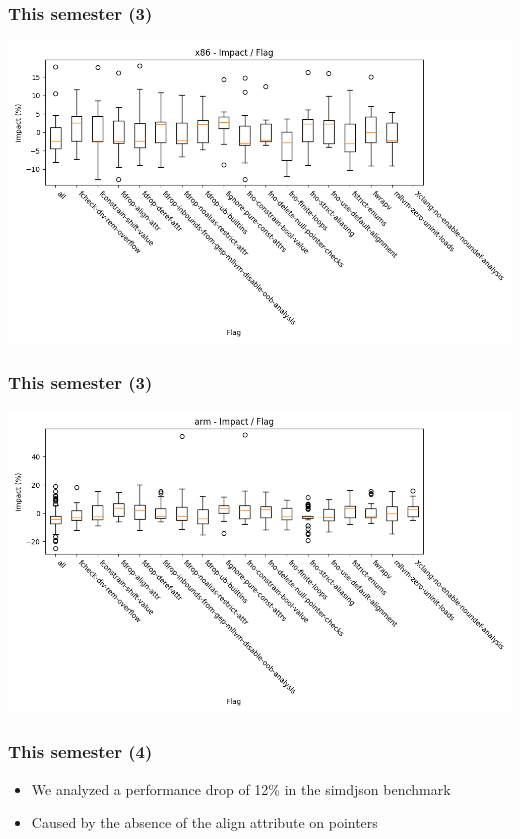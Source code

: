 \documentclass[
	12pt
]{beamer}
\begin{document}
\begin{frame}
  \frametitle{This semester (3)}
  \begin{center}
    \includegraphics[width=1.1\linewidth]{x86_impact_per_flag.png}
  \end{center}
\end{frame}

\begin{frame}
  \frametitle{This semester (3)}
  \begin{center}
    \includegraphics[width=1.1\linewidth]{arm_impact_per_flag.png}
  \end{center}
\end{frame}

\begin{frame}
  \frametitle{This semester (4)}
  \begin{itemize}
    \item We analyzed a performance drop of 12\% in the simdjson benchmark
    \item Caused by the absence of the align attribute on pointers
  \end{itemize}
\end{frame}
\end{document}
